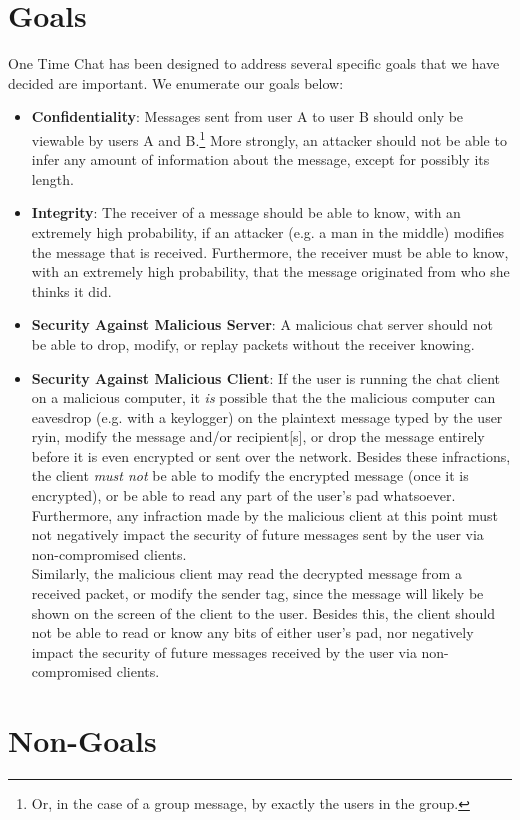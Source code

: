 \documentclass[twocolumn]{article}
\begin{document}
\section{Goals}
One Time Chat has been designed to address several specific goals that we have decided are important. We enumerate our goals below:
\begin{itemize}
\item \textbf{Confidentiality}: Messages sent from user A to user B should only be viewable by users A and B.\footnote{
Or, in the case of a group message, by exactly the users in the group.
}
More strongly, an attacker should not be able to infer any amount of information about the message, except for possibly its length.
\item \textbf{Integrity}: The receiver of a message should be able to know, with an extremely high probability, if an attacker (e.g. a man in the middle) modifies the message that is received. Furthermore, the receiver must be able to know, with an extremely high probability, that the message originated from who she thinks it did.
\item \textbf{Security Against Malicious Server}: A malicious chat server should not be able to drop, modify, or replay packets without the receiver knowing.
\item \textbf{Security Against Malicious Client}: If the user is running the chat client on a malicious computer, it \emph{is} possible that the the malicious computer can eavesdrop (e.g. with a keylogger) on the plaintext message typed by the user ryin, modify the message and/or recipient[s], or drop the message entirely before it is even encrypted or sent over the network. Besides these infractions, the client \emph{must not} be able to modify the encrypted message (once it is encrypted), or be able to read any part of the user's pad whatsoever. Furthermore, any infraction made by the malicious client at this point must not negatively impact the security of future messages sent by the user via non-compromised clients.\\
Similarly, the malicious client may read the decrypted message from a received packet, or modify the sender tag, since the message will likely be shown on the screen of the client to the user. Besides this, the client should not be able to read or know any bits of either user's pad, nor negatively impact the security of future messages received by the user via non-compromised clients.
\end{itemize}

\section{Non-Goals}
\end{document}
